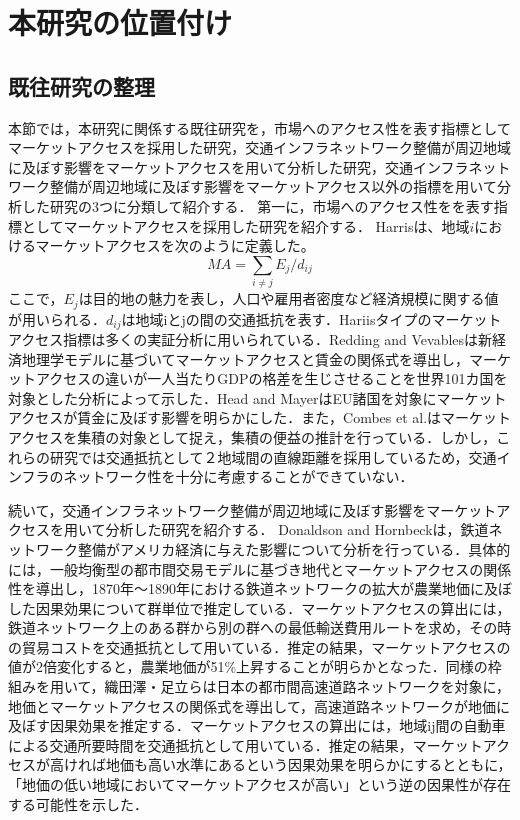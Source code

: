 \chapter{本研究の位置付け}

\section{既往研究の整理}
本節では，本研究に関係する既往研究を，市場へのアクセス性を表す指標としてマーケットアクセスを採用した研究，交通インフラネットワーク整備が周辺地域に及ぼす影響をマーケットアクセスを用いて分析した研究，交通インフラネットワーク整備が周辺地域に及ぼす影響をマーケットアクセス以外の指標を用いて分析した研究の3つに分類して紹介する．
第一に，市場へのアクセス性をを表す指標としてマーケットアクセスを採用した研究を紹介する．
Harris\cite{harrisc1954}は、地域$i$におけるマーケットアクセスを次のように定義した。
\[ MA = \sum_{i \neq j}{E_{j}/d_{ij}}\]
ここで，$E_{j}$は目的地の魅力を表し，人口や雇用者密度など経済規模に関する値が用いられる．$d_{ij}$は地域iとjの間の交通抵抗を表す．Hariisタイプのマーケットアクセス指標は多くの実証分析に用いられている．Redding and Vevables\cite{redding2004}は新経済地理学モデルに基づいてマーケットアクセスと賃金の関係式を導出し，マーケットアクセスの違いが一人当たりGDPの格差を生じさせることを世界101カ国を対象とした分析によって示した．Head and Mayer\cite{head2006}はEU諸国を対象にマーケットアクセスが賃金に及ぼす影響を明らかにした．また，Combes et al.\cite{combes2010}はマーケットアクセスを集積の対象として捉え，集積の便益の推計を行っている．しかし，これらの研究では交通抵抗として２地域間の直線距離を採用しているため，交通インフラのネットワーク性を十分に考慮することができていない．
 
続いて，交通インフラネットワーク整備が周辺地域に及ぼす影響をマーケットアクセスを用いて分析した研究を紹介する．
Donaldson and Hornbeck\cite{donaldson2016}は，鉄道ネットワーク整備がアメリカ経済に与えた影響について分析を行っている．具体的には，一般均衡型の都市間交易モデルに基づき地代とマーケットアクセスの関係性を導出し，1870年〜1890年における鉄道ネットワークの拡大が農業地価に及ぼした因果効果について群単位で推定している．マーケットアクセスの算出には，鉄道ネットワーク上のある群から別の群への最低輸送費用ルートを求め，その時の貿易コストを交通抵抗として用いている．推定の結果，マーケットアクセスの値が2倍変化すると，農業地価が51\%上昇することが明らかとなった．同様の枠組みを用いて，織田澤・足立ら\cite{otazawa2022}は日本の都市間高速道路ネットワークを対象に，地価とマーケットアクセスの関係式を導出して，高速道路ネットワークが地価に及ぼす因果効果を推定する．マーケットアクセスの算出には，地域ij間の自動車による交通所要時間を交通抵抗として用いている．推定の結果，マーケットアクセスが高ければ地価も高い水準にあるという因果効果を明らかにするとともに，「地価の低い地域においてマーケットアクセスが高い」という逆の因果性が存在する可能性を示した．

